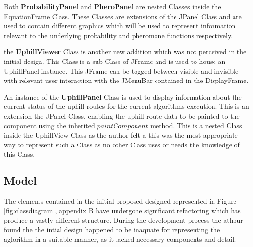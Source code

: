 Both \textbf{ProbabilityPanel} and \textbf{PheroPanel} are nested Classes inside the EquationFrame Class. These Classes are extensions of the JPanel Class and are used to contain different graphics which will be used to represent information relevant to the underlying probability and pheromone functions respectively.

the \textbf{UphillViewer} Class is another new addition which was not perceived in the initial design. This Class is a sub Class of JFrame and is used to house an UphillPanel instance. This JFrame can be togged between visible and invisible with relevant user interaction with the JMenuBar contained in the DisplayFrame.

An instance of the \textbf{UphillPanel} Class is used to display information about the current status of the uphill routes for the current algorithms execution. This is an extension the JPanel Class, enabling the uphill route data to be painted to the component using the inherited $paintComponent$ method. This is a nested Class inside the UphillView Class as the author felt a this was the most appropriate way to represent such a Class  as no other Class uses or needs the knowledge of this Class.

\subsection{Model}

The elements contained in the initial proposed designed represented in  Figure \ref{fig:classdiagram}, appendix B have undergone significant refactoring which has produce a vastly different structure. During the development process the athour found the the intial design happened to be inaquate for representing the aglorithm in a suitable manner, as it lacked necessary components and detail.

